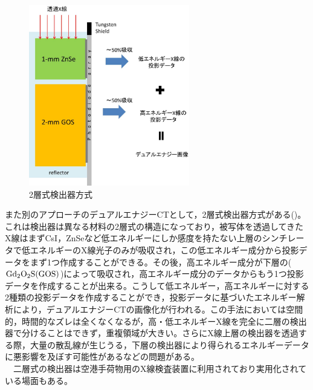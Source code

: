 \begin{figure}[H]
 \begin{center}
 \includegraphics[width=7cm]{image/other/two_layer.eps}
 \end{center}
 \caption{2層式検出器方式\cite{philips}}
 \label{fig:two_layer}
\end{figure}

また別のアプローチのデュアルエナジーCTとして，2層式検出器方式がある()。これは検出器は異なる材料の2層式の構造になっており，被写体を透過してきたX線はまずCsI，ZnSeなど低エネルギーにしか感度を持たない上層のシンチレータで低エネルギーのX線光子のみが吸収され，この低エネルギー成分から投影データをまず1つ作成することができる。その後，高エネルギー成分が下層の($\rm Gd_2O_2S(GOS)$)によって吸収され，高エネルギー成分のデータからもう1つ投影データを作成することが出来る。こうして低エネルギー，高エネルギーに対する2種類の投影データを作成することができ，投影データに基づいたエネルギー解析により，デュアルエナジーCTの画像化が行われる。この手法においては空間的，時間的なズレは全くなくなるが，高・低エネルギーX線を完全に二層の検出器で分けることはできず，重複領域が大きい。さらにX線上層の検出器を透過する際，大量の散乱線が生じうる，下層の検出器により得られるエネルギーデータに悪影響を及ぼす可能性があるなどの問題がある。\\\ \ 二層式の検出器は空港手荷物用のX線検査装置に利用されており実用化されている場面もある\cite{airport_1}\cite{airport_2}。


